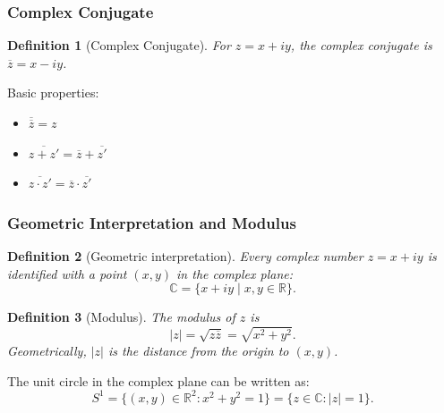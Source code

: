 \documentclass{article}
\newtheorem{definition}{Definition}
\begin{document}
\subsubsection{Complex Conjugate}
\begin{definition}[Complex Conjugate]
    For $z = x + iy$, the complex conjugate is $\overline{z} = x - iy$.
\end{definition}
Basic properties:
\begin{itemize}
    \item $\overline{\overline{z}} = z$
    \item $\overline{z + z'} = \overline{z} + \overline{z'}$
    \item $\overline{z \cdot z'} = \overline{z} \cdot \overline{z'}$
\end{itemize}

\subsubsection{Geometric Interpretation and Modulus}
\begin{definition}[Geometric interpretation]
    Every complex number $z = x + iy$ is identified with a point $(x,y)$ in the complex plane:
    \[\mathbb{C} = \{x + iy \mid x,y \in \mathbb{R}\}.\]
\end{definition}
\begin{center}
\end{center}
\begin{definition}[Modulus]
    The modulus of $z$ is
    \[|z| = \sqrt{z\overline{z}} = \sqrt{x^2 + y^2}.\]
    Geometrically, $|z|$ is the distance from the origin to $(x,y)$.
\end{definition}
The unit circle in the complex plane can be written as:
\[S^1 = \{(x,y) \in \mathbb{R}^2 : x^2 + y^2 = 1\} = \{ z \in \mathbb{C} : |z| = 1\}.\]
\end{document}
